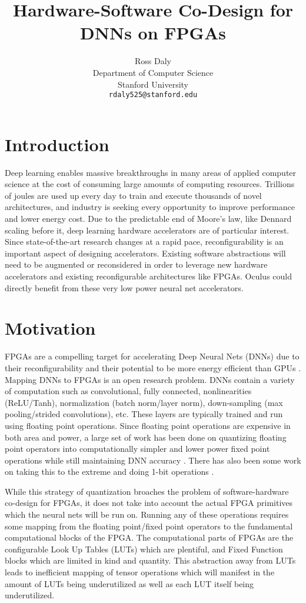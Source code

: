 \documentclass{article}
\title{Hardware-Software Co-Design for DNNs on FPGAs}
\author{
  Ross Daly\\
  Department of Computer Science\\
  Stanford University\\
  \texttt{rdaly525@stanford.edu} \\
}
\begin{document}

\maketitle

\section{Introduction}
Deep learning enables massive breakthroughs in many areas of applied computer science at the cost of consuming large amounts of computing resources. Trillions of joules are used up every day to train and execute thousands of novel architectures, and industry is seeking every opportunity to improve performance and lower energy cost. Due to the predictable end of Moore’s law, like Dennard scaling before it, deep learning hardware accelerators are of particular interest. Since state-of-the-art research changes at a rapid pace, reconfigurability is an important aspect of designing accelerators. Existing software abstractions will need to be augmented or reconsidered in order to leverage new hardware accelerators and existing reconfigurable architectures like FPGAs. Oculus could directly benefit from these very low power neural net accelerators. 

\section{Motivation}
FPGAs are a compelling target for accelerating Deep Neural Nets (DNNs) due to their reconfigurability and their potential to be more energy efficient than GPUs \cite{zhang2015optimizing}. Mapping DNNs to FPGAs is an open research problem. DNNs contain a variety of computation such as convolutional, fully connected, nonlinearities (ReLU/Tanh), normalization (batch norm/layer norm), down-sampling (max pooling/strided convolutions), etc. These layers are typically trained and run using floating point operations. Since floating point operations are expensive in both area and power, a large set of work has been done on quantizing floating point operators into computationally simpler and lower power fixed point operations while still maintaining DNN accuracy \cite{han2015deep}. There has also been some work on taking this to the extreme and doing 1-bit operations \cite{rastegari2016xnor}.

While this strategy of quantization broaches the problem of software-hardware co-design for FPGAs, it does not take into account the actual FPGA primitives which the neural nets will be run on. Running any of these operations requires some mapping from the floating point/fixed point operators to the fundamental computational blocks of the FPGA. The computational parts of FPGAs are the configurable Look Up Tables (LUTs) which are plentiful, and Fixed Function blocks which are limited in kind and quantity. 
This abstraction away from LUTs leads to inefficient mapping of tensor operations which will manifest in the amount of LUTs being underutilized as well as each LUT itself being underutilized. 
\end{document}
